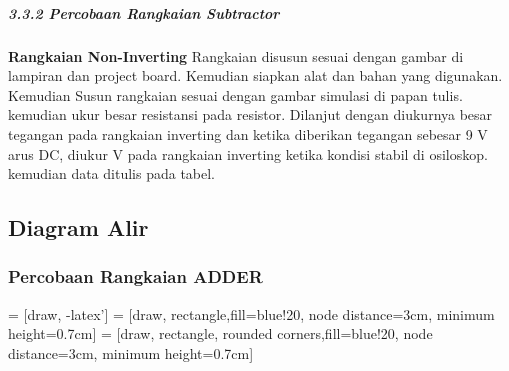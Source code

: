 \documentclass[12pt,a4paper]{article}
\begin{document}
\subparagraph{3.3.2 Percobaan Rangkaian Subtractor }
\subparagraph{ }
	\textbf{Rangkaian Non-Inverting} Rangkaian disusun sesuai dengan gambar di lampiran dan project board. Kemudian siapkan alat dan bahan yang digunakan. Kemudian Susun rangkaian sesuai dengan gambar simulasi di papan tulis. kemudian ukur besar resistansi pada resistor. Dilanjut dengan diukurnya besar tegangan pada rangkaian inverting dan ketika diberikan tegangan sebesar 9 V arus DC, diukur  V pada rangkaian inverting ketika kondisi stabil di osiloskop. kemudian data ditulis pada tabel.

\subsection{Diagram Alir}
\subsubsection{Percobaan Rangkaian ADDER }
 = [draw, -latex']
 = [draw, rectangle,fill=blue!20, node distance=3cm,
    minimum height=0.7cm]
 = [draw, rectangle, rounded corners,fill=blue!20, node distance=3cm,
    minimum height=0.7cm]
\end{document}
